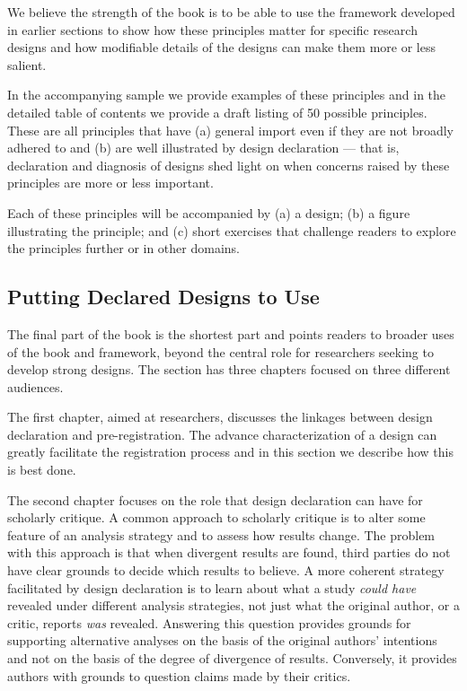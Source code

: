 \documentclass[11pt]{article}
\begin{document}
We believe the strength of the book is to be able to use the framework developed in earlier sections to show how these principles matter for specific research designs and how modifiable details of the designs can make them more or less salient. 

In the accompanying sample we provide examples of these principles and in the detailed table of contents we provide a draft listing of 50 possible principles. These are all principles that have (a) general import even if they are not broadly adhered to and (b) are well illustrated by design declaration --- that is, declaration and diagnosis of designs shed light on when concerns raised by these principles are more or less important.

Each of these principles will be accompanied by (a) a design; (b) a figure illustrating the principle; and (c) short exercises that challenge readers to explore the principles further or in other domains. 

\subsection{Putting Declared Designs to Use}
The final part of the book is the shortest part and points readers to broader uses of the book and framework, beyond the central role for researchers seeking to develop strong designs. The section has three chapters focused on three different audiences.

The first chapter, aimed at researchers, discusses the linkages between design declaration and pre-registration. The advance characterization of a design can greatly facilitate the registration process and in this section we describe how this is best done. 

The second chapter focuses on the role that design declaration can have for scholarly critique. A common approach to scholarly critique is to alter some feature of an analysis strategy and to assess how results change. The problem with this approach is that when divergent results are found, third parties do not have clear grounds to decide which results to believe. A more coherent strategy facilitated by design declaration is to learn about what a study {\it could have} revealed under different analysis strategies, not just what the original author, or a critic, reports {\it was} revealed. Answering this question provides grounds for supporting alternative analyses on the basis of the original authors' intentions and not on the basis of the degree of divergence of results. Conversely, it provides authors with grounds to question claims made by their critics. 
\end{document}
